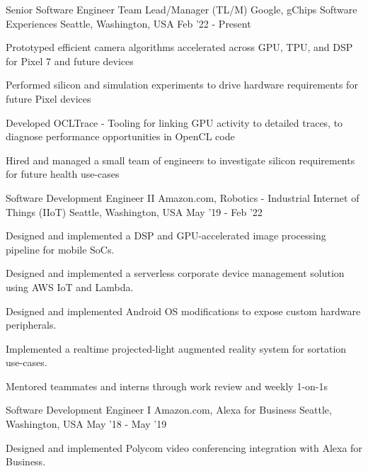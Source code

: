 \begin{cventries}
\cventry
    {Senior Software Engineer Team Lead/Manager (TL/M)} %
    {Google, gChips Software Experiences} %
    {Seattle, Washington, USA} %
    {Feb '22 - Present} %
    {
        \begin{cvitems}
          \item Prototyped efficient camera algorithms accelerated across GPU, TPU, and DSP for Pixel 7 and future devices
          \item Performed silicon and simulation experiments to drive hardware requirements for future Pixel devices
          \item Developed OCLTrace - Tooling for linking GPU activity to detailed traces, to diagnose performance opportunities in OpenCL code
          \item Hired and managed a small team of engineers to investigate silicon requirements for future health use-cases
        \end{cvitems}
    }
\vspace{4mm}
\cventry
    {Software Development Engineer II} %
    {Amazon.com, Robotics - Industrial Internet of Things (IIoT)} %
    {Seattle, Washington, USA} %
    {May '19 - Feb '22} %
    {
        \begin{cvitems}
            \item Designed and implemented a DSP and GPU-accelerated image processing pipeline for mobile SoCs.
            \item Designed and implemented a serverless corporate device management solution using AWS IoT and Lambda.
            \item Designed and implemented Android OS modifications to expose custom hardware peripherals.
            \item Implemented a realtime projected-light augmented reality system for sortation use-cases.
            \item Mentored teammates and interns through work review and weekly 1-on-1s
        \end{cvitems}
    }
\vspace{4mm}
\cventry
    {Software Development Engineer I} %
    {Amazon.com, Alexa for Business} %
    {Seattle, Washington, USA} %
    {May '18 - May '19} %
    {
        \begin{cvitems}
            \item Designed and implemented Polycom video conferencing integration with Alexa for Business.

\end{cvitems}}
\end{cventries}
